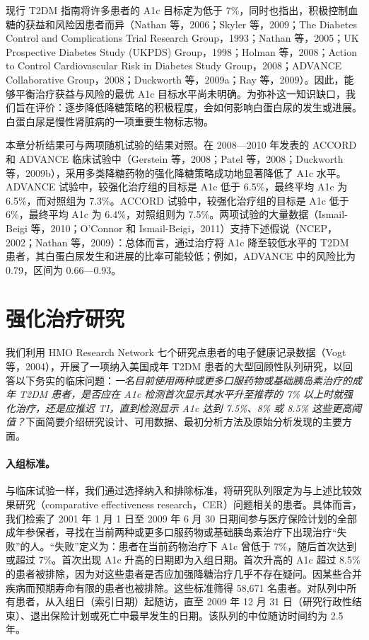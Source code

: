 现行 T2DM 指南将许多患者的 A1c 目标定为低于 7\%，同时也指出，积极控制血糖的获益和风险因患者而异（Nathan 等，2006；Skyler 等，2009；The Diabetes Control and Complications Trial Research Group，1993；Nathan 等，2005；UK Prospective Diabetes Study (UKPDS) Group，1998；Holman 等，2008；Action to Control Cardiovascular Risk in Diabetes Study Group，2008；ADVANCE Collaborative Group，2008；Duckworth 等，2009a；Ray 等，2009）。因此，能够平衡治疗获益与风险的最优 A1c 目标水平尚未明确。为弥补这一知识缺口，我们旨在评价：逐步降低降糖策略的积极程度，会如何影响白蛋白尿的发生或进展。白蛋白尿是慢性肾脏病的一项重要生物标志物。

本章分析结果可与两项随机试验的结果对照。在 2008—2010 年发表的 ACCORD 和 ADVANCE 临床试验中（Gerstein 等，2008；Patel 等，2008；Duckworth 等，2009b），采用多类降糖药物的强化降糖策略成功地显著降低了 A1c 水平。ADVANCE 试验中，较强化治疗组的目标是 A1c 低于 6.5\%，最终平均 A1c 为 6.5\%，而对照组为 7.3\%。ACCORD 试验中，较强化治疗组的目标是 A1c 低于 6\%，最终平均 A1c 为 6.4\%，对照组则为 7.5\%。两项试验的大量数据（Ismail-Beigi 等，2010；O'Connor 和 Ismail-Beigi，2011）支持下述假说（NCEP，2002；Nathan 等，2009）：总体而言，通过治疗将 A1c 降至较低水平的 T2DM 患者，其白蛋白尿发生和进展的比率可能较低；例如，ADVANCE 中的风险比为 0.79，区间为 0.66—0.93。

\section{强化治疗研究}

我们利用 HMO Research Network 七个研究点患者的电子健康记录数据（Vogt 等，2004），开展了一项纳入美国成年 T2DM 患者的大型回顾性队列研究，以回答以下务实的临床问题：\emph{一名目前使用两种或更多口服药物或基础胰岛素治疗的成年 T2DM 患者，是否应在 A1c 检测首次显示其水平升至推荐的 7\% 以上时就强化治疗，还是应推迟 TI，直到检测显示 A1c 达到 7.5\%、8\% 或 8.5\% 这些更高阈值？}下面简要介绍研究设计、可用数据、最初分析方法及原始分析发现的主要方面。

\paragraph{入组标准。}
与临床试验一样，我们通过选择纳入和排除标准，将研究队列限定为与上述比较效果研究（comparative effectiveness research，CER）问题相关的患者。具体而言，我们检索了 2001 年 1 月 1 日至 2009 年 6 月 30 日期间参与医疗保险计划的全部成年参保者，寻找在当前两种或更多口服药物或基础胰岛素治疗下出现治疗“失败”的人。“失败”定义为：患者在当前药物治疗下 A1c 曾低于 7\%，随后首次达到或超过 7\%。首次出现 A1c 升高的日期即为入组日期。首次升高的 A1c 超过 8.5\% 的患者被排除，因为对这些患者是否应加强降糖治疗几乎不存在疑问。因某些合并疾病而预期寿命有限的患者也被排除。这些标准筛得 58,671 名患者。对队列中所有患者，从入组日（索引日期）起随访，直至 2009 年 12 月 31 日（研究行政性结束）、退出保险计划或死亡中最早发生的日期。该队列的中位随访时间约为 2.5 年。

